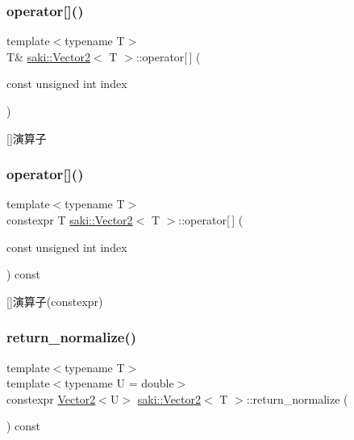 \subsubsection{\texorpdfstring{operator[]()}{operator[]()}\hspace{0.1cm}{\footnotesize\ttfamily [1/2]}}
{\footnotesize\ttfamily template$<$typename T$>$ \\
T\& \mbox{\hyperlink{classsaki_1_1_vector2}{saki\+::\+Vector2}}$<$ T $>$\+::operator\mbox{[}$\,$\mbox{]} (\begin{DoxyParamCaption}\item[{const unsigned int}]{index }\end{DoxyParamCaption})\hspace{0.3cm}{\ttfamily [inline]}}



\mbox{[}\mbox{]}演算子 

\mbox{\label{classsaki_1_1_vector2_a17a66123c5c054e022a4c5533f9b5a1b}} 
\subsubsection{\texorpdfstring{operator[]()}{operator[]()}\hspace{0.1cm}{\footnotesize\ttfamily [2/2]}}
{\footnotesize\ttfamily template$<$typename T$>$ \\
constexpr T \mbox{\hyperlink{classsaki_1_1_vector2}{saki\+::\+Vector2}}$<$ T $>$\+::operator\mbox{[}$\,$\mbox{]} (\begin{DoxyParamCaption}\item[{const unsigned int}]{index }\end{DoxyParamCaption}) const\hspace{0.3cm}{\ttfamily [inline]}}



\mbox{[}\mbox{]}演算子(constexpr) 

\mbox{\label{classsaki_1_1_vector2_ad4fe2f7cb118bfad82333017c15c591a}} 
\subsubsection{\texorpdfstring{return\+\_\+normalize()}{return\_normalize()}}
{\footnotesize\ttfamily template$<$typename T$>$ \\
template$<$typename U  = double$>$ \\
constexpr \mbox{\hyperlink{classsaki_1_1_vector2}{Vector2}}$<$U$>$ \mbox{\hyperlink{classsaki_1_1_vector2}{saki\+::\+Vector2}}$<$ T $>$\+::return\+\_\+normalize (\begin{DoxyParamCaption}{ }\end{DoxyParamCaption}) const\hspace{0.3cm}{\ttfamily [inline]}}



